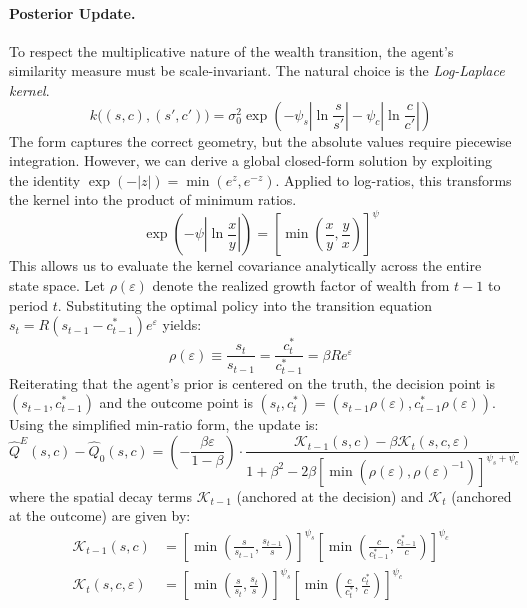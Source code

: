 \paragraph{Posterior Update.} To respect the multiplicative nature of the wealth transition, the agent's similarity 
measure must be scale-invariant. The natural choice is the \textit{Log-Laplace kernel}.
\begin{equation}
k\big((s,c), (s',c')\big) = \sigma_0^2 \exp\left( -\psi_s \left|\ln\frac{s}{s'}\right| - \psi_c \left|\ln\frac{c}{c'}\right| \right)
\end{equation}
The form captures the correct geometry, but the absolute values require piecewise 
integration. However, we can derive a global closed-form solution by 
exploiting the identity $\exp(-|z|)=\min(e^z, e^{-z})$. Applied to log-ratios, this 
transforms the kernel into the product of minimum ratios.
\begin{equation}
\exp\left(-\psi \left|\ln\frac{x}{y}\right|\right) = \left[ \min\left(\frac{x}{y}, \frac{y}{x}\right) \right]^\psi
\end{equation}
This allows us to evaluate the kernel covariance analytically across the entire state space.
Let $\rho(\varepsilon)$ denote the realized growth factor of wealth from $t-1$ to period $t$.
Substituting the optimal policy into the transition equation $s_t = R(s_{t-1} - c_{t-1}^*) e^\varepsilon$ yields:
\begin{equation}
\rho(\varepsilon) \equiv \frac{s_t}{s_{t-1}} = \frac{c_t^*}{c_{t-1}^*} = \beta R e^\varepsilon
\end{equation}
Reiterating that the agent's prior is centered on the truth, the decision point is 
$(s_{t-1}, c_{t-1}^*)$ and the outcome point is 
$(s_t, c_t^*) = (s_{t-1}\rho(\varepsilon), c_{t-1}^*\rho(\varepsilon))$. 
Using the simplified min-ratio form, the update is:
\begin{equation}
\hat{Q}^E(s,c) - \hat{Q}_0(s,c) =
\left( -\frac{\beta \varepsilon}{1-\beta} \right)
\cdot
\frac{ \mathcal{K}_{t-1}(s,c) - \beta \mathcal{K}_t(s,c, \varepsilon) }{ 1 + \beta^2 - 2\beta \left[ \min\left(\rho(\varepsilon), \rho(\varepsilon)^{-1}\right) \right]^{\psi_s+\psi_c} }
\end{equation}
where the spatial decay terms $\mathcal{K}_{t-1}$ (anchored at the decision) and $\mathcal{K}_t $ (anchored at the outcome) are given by:
\begin{align}
\mathcal{K}_{t-1}(s,c) &= \left[ \min\left(\frac{s}{s_{t-1}}, \frac{s_{t-1}}{s}\right) \right]^{\psi_s} \left[ \min\left(\frac{c}{c_{t-1}^*}, \frac{c_{t-1}^*}{c}\right) \right]^{\psi_c} \\
\mathcal{K}_t(s,c, \varepsilon) &= \left[ \min\left(\frac{s}{s_t}, \frac{s_t}{s}\right) \right]^{\psi_s} \left[ \min\left(\frac{c}{c_t^*}, \frac{c_t^*}{c}\right) \right]^{\psi_c}
\end{align}

